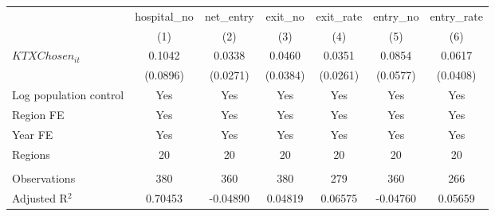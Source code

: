\begingroup
\centering
\begin{tabular}{lcccccc}
   \toprule
                          & hospital\_no  & net\_entry  & exit\_no  & exit\_rate  & entry\_no  & entry\_rate \\    
                          & (1)           & (2)         & (3)       & (4)         & (5)        & (6)\\  
   \midrule 
   $KTXChosen_{it}$       & 0.1042        & 0.0338      & 0.0460    & 0.0351      & 0.0854     & 0.0617\\   
                          & (0.0896)      & (0.0271)    & (0.0384)  & (0.0261)    & (0.0577)   & (0.0408)\\   
   Log population control & Yes           & Yes         & Yes       & Yes         & Yes        & Yes\\  
   Region FE              & Yes           & Yes         & Yes       & Yes         & Yes        & Yes\\  
   Year FE                & Yes           & Yes         & Yes       & Yes         & Yes        & Yes\\  
   Regions                & 20            & 20          & 20        & 20          & 20         & 20\\  
    \\
   Observations           & 380           & 360         & 380       & 279         & 360        & 266\\  
   Adjusted R$^2$         & 0.70453       & -0.04890    & 0.04819   & 0.06575     & -0.04760   & 0.05659\\  
   \bottomrule
\end{tabular}
\par\endgroup
